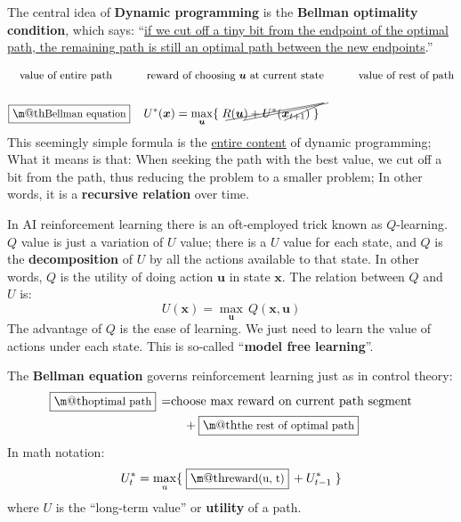 \documentclass[orivec]{llncs}
\makeatletter
\newcommand{\emp}[1]{\textbf{#1}}
\newcommand{\tikzmark}[1]{\tikz[overlay,remember picture] \node (#1) {};}
\newcommand{\vect}[1]{\boldsymbol{#1}}
\renewcommand{\boxed}[1]{\fbox{\m@th$\displaystyle\scalebox{0.9}{#1}$} \,}
\makeatother
\begin{document}
The central idea of \textbf{Dynamic programming} is the \textbf{Bellman optimality condition}, %
which says:  ``\uline{if we cut off a tiny bit from the endpoint of the optimal path, the remaining path is still an optimal path between the new endpoints}.''

\begin{eqnarray}
& \mbox{\footnotesize value of entire path} \tikzmark{uEntire} \quad \quad \mbox{\footnotesize reward of choosing $\vect{u}$ at current state} \tikzmark{rCurrent} \quad \quad \mbox{\footnotesize value of rest of path} \tikzmark{uRest} \nonumber \\
\nonumber \\
& \boxed{\mbox{Bellman equation}} \quad \tikzmark{UEntire} U^*(\vect{x}) = \max\limits_{\vect{u}} \{ \; \tikzmark{RCurrent} R(\vect{u}) + \tikzmark{URest} U^*(\vect{x}_{t+1}) \; \}
\begin{tikzpicture}[overlay,remember picture]
  \draw (uEntire.center) +(-30pt,-3pt) -- ([shift={(4pt,12pt)}]UEntire.center);
  \draw (rCurrent.center) +(-80pt,-3pt) -- ([shift={(4pt,12pt)}]RCurrent.center);
  \draw (uRest.center) +(-65pt,-3pt) -- ([shift={(8pt,12pt)}]URest.center);
\end{tikzpicture}
\end{eqnarray}
This seemingly simple formula is the \uline{entire content} of dynamic programming;  What it means is that:  When seeking the path with the best value, we cut off a bit from the path, thus reducing the problem to a smaller problem;  In other words, it is a \textbf{recursive relation} over time.

In AI reinforcement learning there is an oft-employed trick known as $Q$-learning.  $Q$ value is just a variation of $U$ value;  there is a $U$ value for each state, and $Q$ is the \textbf{decomposition} of $U$ by all the actions available to that state.  In other words, $Q$ is the utility of doing action $\vect{u}$ in state $\vect{x}$.  The relation between $Q$ and $U$ is:
\begin{equation}
U(\vect{x}) = \max\limits_{\vect{u}} \, Q(\vect{x}, \vect{u})
\end{equation}
The advantage of $Q$ is the ease of learning.  We just need to learn the value of actions under each state.  This is so-called ``\textbf{model free learning}''.

The \emp{Bellman equation} governs reinforcement learning just as in control theory:
\begin{eqnarray}
\boxed{\mbox{optimal path}} = & \mbox{choose max reward on current path segment} \nonumber \\
& \quad + \boxed{\mbox{the rest of optimal path}}
\end{eqnarray}
In math notation:
\begin{equation}
U^*_t = \max_{u} \{ \; \boxed{\mbox{reward}(u, t)} + U^*_{t-1} \; \}
\end{equation}
where $U$ is the ``long-term value'' or \emp{utility} of a path.
\end{document}
